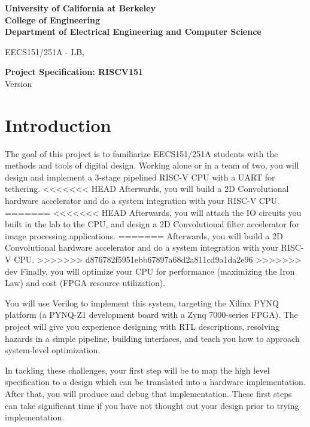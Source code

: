 \documentclass[11pt]{article}
\begin{document}
\begin{center}
{\bf
University of California at Berkeley \\
College of Engineering \\
Department of Electrical Engineering and Computer Science \\
}
\end{center}

\begin{center}
EECS151/251A - LB, \currentSemester
\end{center}

\begin{center}
\LARGE
{\bf Project Specification: RISCV151 }  \\
Version \projectSpecVersion
\end{center}

\tableofcontents

\newpage

\section{Introduction}
The goal of this project is to familiarize EECS151/251A students with the methods and tools of digital design.
Working alone or in a team of two, you will design and implement a 3-stage pipelined RISC-V CPU with a UART for tethering.
<<<<<<< HEAD
Afterwards, you will build a 2D Convolutional hardware accelerator and do a system integration with your RISC-V CPU.
=======
<<<<<<< HEAD
Afterwards, you will attach the IO circuits you built in the lab to the CPU, and design a 2D Convolutional filter accelerator for image processing applications.
=======
Afterwards, you will build a 2D Convolutional hardware accelerator and do a system integration with your RISC-V CPU.
>>>>>>> d876782f5951ebb67897a68d2a811cd9a1da2e96
>>>>>>> dev
Finally, you will optimize your CPU for performance (maximizing the Iron Law) and cost (FPGA resource utilization).

You will use Verilog to implement this system, targeting the Xilinx PYNQ platform (a PYNQ-Z1 development board with a Zynq 7000-series FPGA).
The project will give you experience designing with RTL descriptions, resolving hazards in a simple pipeline, building interfaces, and teach you how to approach system-level optimization.

In tackling these challenges, your first step will be to map the high level specification to a design which can be translated into a hardware implementation.
After that, you will produce and debug that implementation.
These first steps can take significant time if you have not thought out your design prior to trying implementation.
\end{document}
